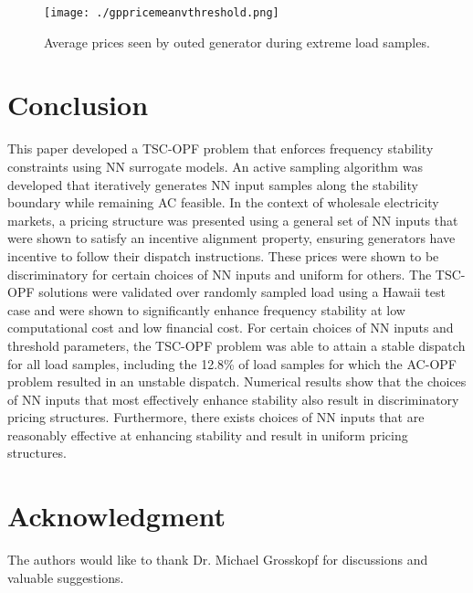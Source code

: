 \documentclass[lettersize,journal]{IEEEtran}
\begin{document}
\begin{figure}[h!]
    \centering
    \texttt{[image: ./gppricemeanvthreshold.png]}
    \caption{Average prices seen by outed generator during extreme load samples.}
    \label{prices}
\end{figure}

\section{Conclusion}\label{SecV}
This paper developed a TSC-OPF problem that enforces frequency stability constraints using NN surrogate models.  An active sampling algorithm was developed that iteratively generates NN input samples along the stability boundary while remaining AC feasible.  In the context of wholesale electricity markets, a pricing structure was presented using a general set of NN inputs that were shown to satisfy an incentive alignment property, ensuring generators have incentive to follow their dispatch instructions.  These prices were shown to be discriminatory for certain choices of NN inputs and uniform for others.  The TSC-OPF solutions were validated over randomly sampled load using a Hawaii test case and were shown to significantly enhance frequency stability at low computational cost and low financial cost.  For certain choices of NN inputs and threshold parameters, the TSC-OPF problem was able to attain a stable dispatch for all load samples, including the 12.8\% of load samples for which the AC-OPF problem resulted in an unstable dispatch. Numerical results show that the choices of NN inputs that most effectively enhance stability also result in discriminatory pricing structures.  Furthermore, there exists choices of NN inputs that are reasonably effective at enhancing stability and result in uniform pricing structures.

\section*{Acknowledgment}
The authors would like to thank Dr. Michael Grosskopf for discussions and valuable suggestions.



\end{document}
